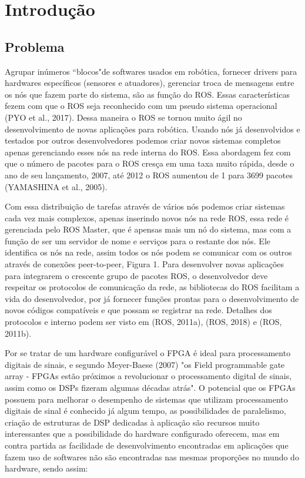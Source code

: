 \chapter{Introdução}



\section{Problema}

Agrupar inúmeros “blocos"de softwares usados em robótica, fornecer drivers para
hardwares específicos (sensores e atuadores), gerenciar troca de mensagens entre os nós
que fazem parte do sistema, são as função do ROS. Essas características fezem com que o ROS
seja reconhecido com um pseudo sistema operacional (PYO et al., 2017). Dessa maneira o
ROS se tornou muito ágil no desenvolvimento de novas aplicações para robótica. Usando
nós já desenvolvidos e testados por outros desenvolvedores podemos criar novos sistemas
completos apenas gerenciando esses nós na rede interna do ROS. Essa abordagem fez com
que o número de pacotes para o ROS cresça em uma taxa muito rápida, desde o ano de
seu lançamento, 2007, até 2012 o ROS aumentou de 1 para 3699 pacotes (YAMASHINA
et al., 2005).

Com essa distribuição de tarefas através de vários nós podemos criar sistemas cada
vez mais complexos, apenas inserindo novos nós na rede ROS, essa rede é gerenciada
pelo ROS Master, que é apensas mais um nó do sistema, mas com a função de ser um
servidor de nome e serviços para o restante dos nós. Ele identifica os nós na rede, assim
todos os nós podem se comunicar com os outros através de conexões peer-to-peer, Figura
1. Para desenvolver novas aplicações para integrarem o crescente grupo de pacotes ROS, o
desenvolvedor deve respeitar os protocolos de comunicação da rede, as bibliotecas do ROS
facilitam a vida do desenvolvedor, por já fornecer funções prontas para o desenvolvimento
de novos códigos compatíveis e que possam se registrar na rede. Detalhes dos protocolos e
interno podem ser visto em (ROS, 2011a), (ROS, 2018) e (ROS, 2011b).

Por se tratar de um hardware configurável o FPGA é ideal para processamento
digitais de sinais, e segundo Meyer-Baese (2007) "os Field programmable gate array -
FPGAs estão próximos a revolucionar o processamento digital de sinais, assim como os
DSPs fizeram algumas décadas atrás". O potencial que os FPGAs possuem para melhorar o 
desempenho de sistemas que utilizam processamento digitais de sinal é conhecido já algum
tempo, as possibilidades de paralelismo, criação de estruturas de DSP dedicadas à aplicação
são recursos muito interessantes que a possibilidade do hardware configurado oferecem,
mas em contra partida as facilidade de desenvolvimento encontradas em aplicações que
fazem uso de softwares não são encontradas nas mesmas proporções no mundo do hardware,
sendo assim:

